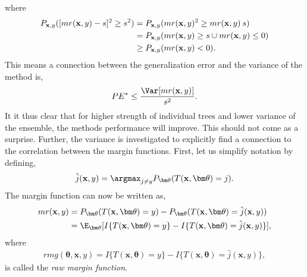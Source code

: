 where
\begin{align}
  P_{\mathbf{x}, y} ([mr(\mathbf{x}, y)-s]^2 \geq s^2)
  &= P_{\mathbf{x}, y} (mr(\mathbf{x}, y)^2 \geq mr(\mathbf{x}, y)\: s) \notag \\
  &= P_{\mathbf{x}, y} (mr(\mathbf{x}, y) \geq s  \cup mr(\mathbf{x}, y) \leq 0) \notag \\
  & \geq P_{\mathbf{x}, y} (mr(\mathbf{x}, y) < 0).
\end{align}
This means a connection between the generalization error and the variance of the method is,
\begin{align}
  \label{eq:PEVar} 
  PE^* \leq  \frac{\Var[mr(\mathbf{x}, y)]}{s^2}.
\end{align}
It it thus clear that for higher strength of individual trees and lower variance of the ensemble, the methods performance will improve. This should not come as a surprise. Further, the variance is investigated to explicitly find a connection to the correlation between the margin functions.  
First, let us simplify notation by defining,
\begin{align}
  \hat j(\mathbf{x}, y) = \argmax_{j \neq y} P_{\bm \theta}(T(\mathbf{x}, \bm \theta) = j).
\end{align}
The margin function can now be written as,
\begin{align}
  mr(\mathbf{x},y) 
  &= P_{\bm \theta}(T(\mathbf{x},\bm \theta) = y) - P_{\bm \theta} (T(\mathbf{x}, \bm \theta) = \hat j (\mathbf{x}, y)) \notag \\
  &= \E_{\bm \theta}[I\{T(\mathbf{x},\bm \theta) = y\} - I\{T(\mathbf{x}, \bm \theta) = \hat j (\mathbf{x}, y)\}],
\end{align}
where
\begin{align}
  rmg(\bm \theta, \mathbf{x}, y) = I\{T(\mathbf{x},\bm \theta) = y\} - I\{T(\mathbf{x}, \bm \theta) = \hat j (\mathbf{x}, y)\},
\end{align}
is called the \textit{raw margin function}.

